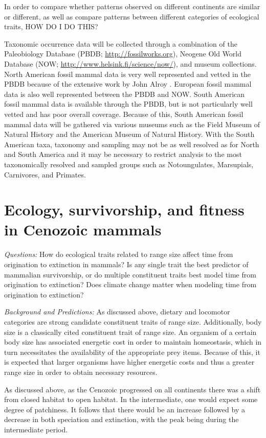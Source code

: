 \documentclass[12pt,letterpaper]{article}
\begin{document}
In order to compare whether patterns observed on different continents are similar or different, as well as compare patterns between different categories of ecological traits, HOW DO I DO THIS?

Taxonomic occurrence data will be collected through a combination of the Paleobiology Database (PBDB; \url{http://fossilworks.org}), Neogene Old World Database (NOW; \url{http://www.helsink.fi/science/now/}), and museum collections. North American fossil mammal data is very well represented and vetted in the PBDB because of the extensive work by John Alroy \citep{Alroy1996a,Alroy1998,Alroy2000g}. European fossil mammal data is also well represented between the PBDB and NOW. South American fossil mammal data is available through the PBDB, but is not particularly well vetted and has poor overall coverage. Because of this, South American fossil mammal data will be gathered via various museums such as the Field Museum of Natural History and the American Museum of Natural History. With the South American taxa, taxonomy and sampling may not be as well resolved as for North and South America and it may be necessary to restrict analysis to the most taxonomically resolved and sampled groups such as Notoungulates, Marsupials, Carnivores, and Primates.


\section{Ecology, survivorship, and fitness in Cenozoic mammals}

\textit{Questions:} 
How do ecological traits related to range size affect time from origination to extinction in mammals? Is any single trait the best predictor of mammalian survivorship, or do multiple constituent traits best model time from origination to extinction? Does climate change matter when modeling time from origination to extinction?

\textit{Background and Predictions:} 
As discussed above, dietary and locomotor categories are strong candidate constituent traits of range size. Additionally, body size is a classically cited constituent trait of range size. An organism of a certain body size has associated energetic cost in order to maintain homeostasis, which in turn necessitates the availability of the appropriate prey items. Because of this, it is expected that larger organisms have higher energetic costs and thus a greater range size in order to obtain necessary resources. 

As discussed above, as the Cenozoic progressed on all continents there was a shift from closed habitat to open habitat. In the intermediate, one would expect some degree of patchiness. It follows that there would be an increase followed by a decrease in both speciation and extinction, with the peak being during the intermediate period.
\end{document}
